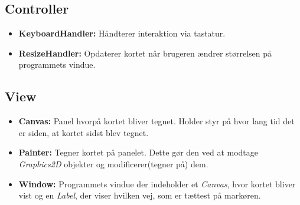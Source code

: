 \subsection{Controller}

\begin{itemize}
	\item \textbf{KeyboardHandler:} Håndterer interaktion via tastatur.
	\item \textbf{ResizeHandler:} Opdaterer kortet når brugeren ændrer størrelsen på programmets vindue.
\end{itemize}

\subsection{View}

\begin{itemize}
	\item \textbf{Canvas:} Panel hvorpå kortet bliver tegnet. Holder styr på hvor lang tid det er siden, at kortet sidst blev tegnet.
	\item \textbf{Painter:} Tegner kortet på panelet. Dette gør den ved at modtage \emph{Graphics2D} objekter og modificerer(tegner på) dem.
	\item \textbf{Window:} Programmets vindue der indeholder et \emph{Canvas}, hvor kortet bliver vist og en \emph{Label}, der viser hvilken vej, som er tættest på markøren.
\end{itemize}